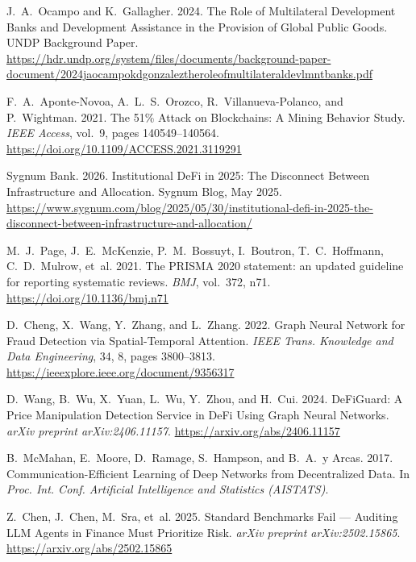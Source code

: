 \documentclass[12pt,a4paper]{report}
\begin{document}
{\begin{enumerate}[label={[\arabic*]}]
\item J.~A.~Ocampo and K.~Gallagher. 2024. The Role of Multilateral Development Banks and Development Assistance in the Provision of Global Public Goods. UNDP Background Paper. \url{https://hdr.undp.org/system/files/documents/background-paper-document/2024jaocampokdgonzaleztheroleofmultilateraldevlmntbanks.pdf}


\item F.~A.~Aponte-Novoa, A.~L.~S.~Orozco, R.~Villanueva-Polanco, and P.~Wightman. 2021. The 51\% Attack on Blockchains: A Mining Behavior Study. \emph{IEEE Access}, vol.~9, pages 140549--140564. \url{https://doi.org/10.1109/ACCESS.2021.3119291}


\item Sygnum Bank. 2026. Institutional DeFi in 2025: The Disconnect Between Infrastructure and Allocation. Sygnum Blog, May 2025. \url{https://www.sygnum.com/blog/2025/05/30/institutional-defi-in-2025-the-disconnect-between-infrastructure-and-allocation/}


\item M.~J.~Page, J.~E.~McKenzie, P.~M.~Bossuyt, I.~Boutron, T.~C.~Hoffmann, C.~D.~Mulrow, et~al. 2021. The PRISMA 2020 statement: an updated guideline for reporting systematic reviews. \emph{BMJ}, vol.~372, n71. \url{https://doi.org/10.1136/bmj.n71}


\item D.~Cheng, X.~Wang, Y.~Zhang, and L.~Zhang. 2022. Graph Neural Network for Fraud Detection via Spatial-Temporal Attention. \emph{IEEE Trans. Knowledge and Data Engineering}, 34, 8, pages 3800--3813. \url{https://ieeexplore.ieee.org/document/9356317}


\item D.~Wang, B.~Wu, X.~Yuan, L.~Wu, Y.~Zhou, and H.~Cui. 2024. DeFiGuard: A Price Manipulation Detection Service in DeFi Using Graph Neural Networks. \emph{arXiv preprint arXiv:2406.11157}. \url{https://arxiv.org/abs/2406.11157}


\item B.~McMahan, E.~Moore, D.~Ramage, S.~Hampson, and B.~A.~y Arcas. 2017. Communication-Efficient Learning of Deep Networks from Decentralized Data. In \emph{Proc. Int. Conf. Artificial Intelligence and Statistics (AISTATS)}.


\item Z.~Chen, J.~Chen, M.~Sra, et~al. 2025. Standard Benchmarks Fail --- Auditing LLM Agents in Finance Must Prioritize Risk. \emph{arXiv preprint arXiv:2502.15865}. \url{https://arxiv.org/abs/2502.15865}



\end{enumerate}}
\end{document}
